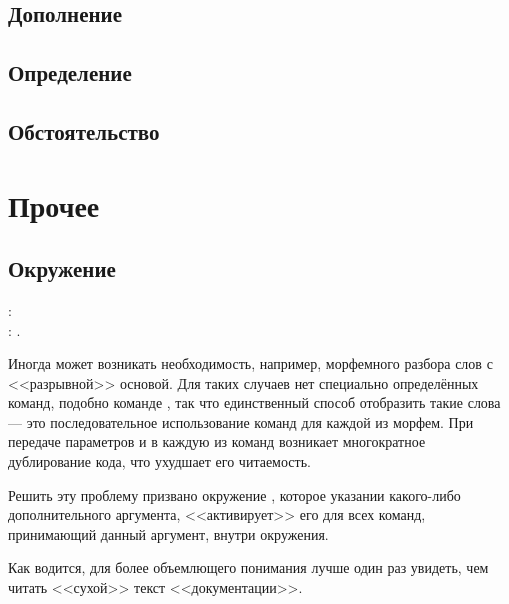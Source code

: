 \subsection{Дополнение}

\subsection{Определение}

\subsection{Обстоятельство}



\section{Прочее}

\subsection{Окружение }

\begin{tcolorbox}
    \noindent\rsTypeAux[env]: \\
    \hspace*{1cm} \rsOptionsAux: .
\end{tcolorbox}

Иногда может возникать необходимость, например, морфемного разбора слов с <<разрывной>> основой. Для таких случаев нет специально
определённых команд, подобно команде , так что единственный способ отобразить такие слова --- это
последовательное использование команд для каждой из морфем. При передаче параметров  и  в каждую из
команд возникает многократное дублирование кода, что ухудшает его читаемость.



Решить эту проблему призвано окружение , которое указании какого-либо дополнительного аргумента, <<активирует>> его для всех команд, принимающий данный аргумент, внутри окружения.

Как водится, для более объемлющего понимания лучше один раз увидеть, чем читать <<сухой>> текст <<документации>>.
